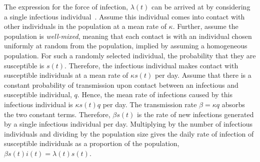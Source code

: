 \documentclass[thesis.tex]{subfiles}
\begin{document}
The expression for the force of infection, $\lambda(t)$ can be arrived at by considering a single infectious individual~\autocite[214]{kretzschmarMathematical}.
Assume this individual comes into contact with other individuals in the population at a mean rate of $\kappa$.
Further, assume the population is \emph{well-mixed}, meaning that each contact is with an individual chosen uniformly at random from the population, implied by assuming a homogeneous population.
For such a randomly selected individual, the probability that they are susceptible is $s(t)$.
Therefore, the infectious individual makes contact with susceptible individuals at a mean rate of $\kappa s(t)$ per day.
Assume that there is a constant probability of transmission upon contact between an infectious and susceptible individual, $q$.
Hence, the mean rate of infections caused by this infectious individual is $\kappa s(t) q$ per day.
The transmission rate $\beta = \kappa q$ absorbs the two constant terms.
Therefore, $\beta s(t)$ is the rate of new infections generated by a single infectious individual per day.
Multiplying by the number of infectious individuals and dividing by the population size gives the daily rate of infection of susceptible individuals as a proportion of the population, $\beta s(t) i(t) = \lambda(t) s(t)$.

\end{document}
